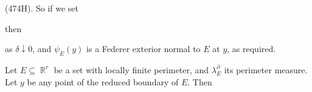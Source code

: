 {

\noindent (474H).   So if we set


\noindent then


\noindent as $\delta\downarrow 0$, and $\psi_E(y)$ is a Federer exterior
normal to $E$ at $y$, as required.
}%

 Let $E\subseteq\BbbR^r$ be a set with locally
finite perimeter, and $\lambda^{\partial}_E$ its perimeter measure.
Let $y$ be any point of the reduced boundary of $E$.   Then


